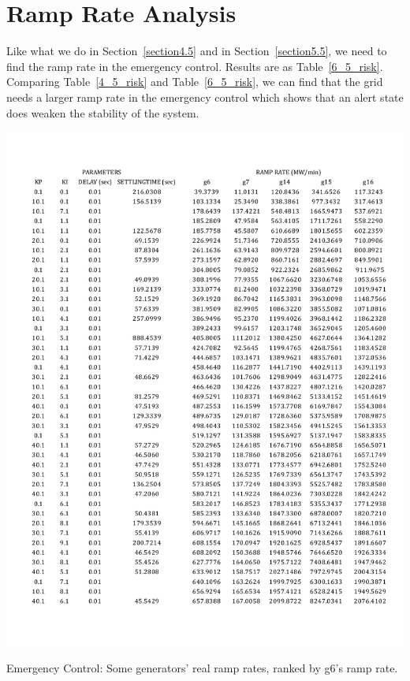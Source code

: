 \section{Ramp Rate Analysis} %

Like what we do in Section~\ref{section4.5} and in Section~\ref{section5.5}, we need to find the ramp rate in the emergency control. Results are as Table~\ref{6_5_risk}. Comparing Table~\ref{4_5_risk} and Table~\ref{6_5_risk}, we can find that the grid needs a larger ramp rate in the emergency control which shows that an alert state does weaken the stability of the system.


\begin{table}[htbp]
\centering
\includegraphics[width = \textwidth]{figure/6_5_risk.pdf}
\caption{Emergency Control: Some generators' real ramp rates, ranked by g6's ramp rate.}
\label{6_5_risk}
\end{table}